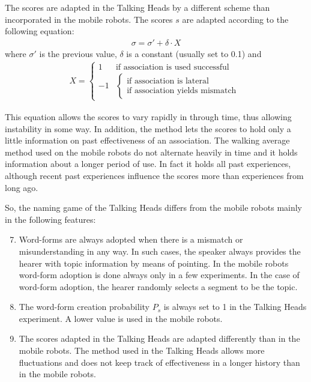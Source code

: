 The scores are adapted in the Talking Heads by a different scheme than incorporated in the mobile robots. The scores $s$ are adapted according to the following equation:
\begin{eqnarray}
\sigma = \sigma' + \delta \cdot X
\end{eqnarray}
where $\sigma'$ is the previous value, $\delta$ is a constant (usually set to 0.1) and
\begin{eqnarray}
X = \left \{ \begin{array}{rl}
1 & \mbox{if association is used successful}\\
-1 & \left \{\begin{array}{l} \mbox{if association is lateral}\\
	\mbox{if association yields mismatch} \end{array} \right.
\end{array}
\right.
\end{eqnarray}


This equation allows the scores to vary rapidly in through time, thus allowing instability in some way. In addition, the method lets the scores to hold only a little information on past effectiveness of an association. The walking average method used on the mobile robots do not alternate heavily in time and it holds information about a longer period of use. In fact it holds all past experiences, although recent past experiences influence the scores more than experiences from long ago.

So, the naming game of the Talking Heads differs from the mobile robots mainly in the following features:

\begin{enumerate}
\setcounter{enumi}{6}
\item Word-forms are always adopted when there is a mismatch or misunderstanding in any way. In such cases, the speaker always provides the hearer with topic information by means of pointing. In the mobile robots word-form adoption is done always only in a few experiments. In the case of word-form adoption, the hearer randomly selects a segment to be the topic.
\item The word-form creation probability $P_s$ is always set to 1 in the Talking Heads experiment. A lower value is used in the mobile robots.
\item The scores adapted in the Talking Heads are adapted differently than in the mobile robots. The method used in the Talking Heads allows more fluctuations and does not keep track of effectiveness in a longer history than in the mobile robots.
\end{enumerate}



